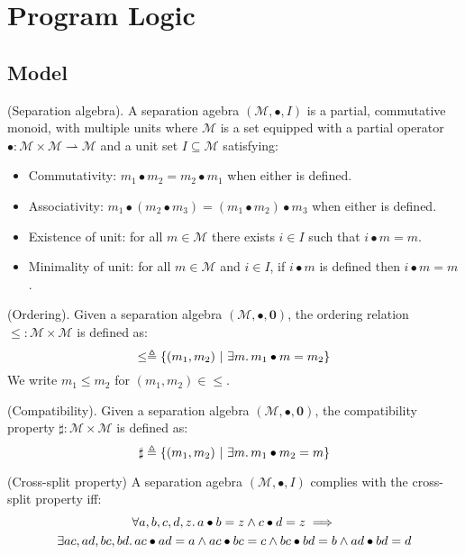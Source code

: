 \section{Program Logic}

\subsection{Model}

 (Separation algebra). A separation agebra $(\mathcal{M}, \bullet, I)$ is a partial, commutative monoid, with multiple units where $\mathcal{M}$ is a set equipped with a partial operator $\bullet : \mathcal{M} \times \mathcal{M} \rightharpoonup \mathcal{M}$ and a unit set $I \subseteq \mathcal{M}$ satisfying:
\begin{itemize}
\item Commutativity: $m_1 \bullet m_2 = m_2 \bullet m_1$ when either is defined.
\item Associativity: $m_1 \bullet (m_2 \bullet m_3) = (m_1 \bullet m_2) \bullet m_3$ when either is defined.
\item Existence of unit: for all $m \in \mathcal{M}$ there exists $i \in I$ such that $i \bullet m = m$.
\item Minimality of unit: for all $m \in \mathcal{M}$ and $i \in I$, if $i \bullet m$ is defined then $i \bullet m = m$.
\end{itemize}

 (Ordering). Given a separation algebra $(\mathcal{M}, \bullet, \mathbf{0})$, the ordering relation $\leq : \mathcal{M} \times \mathcal{M}$ is defined as:
\[
	\leq \triangleq \{ (m_1, m_2)\ |\ \exists m \ldotp m_1 \bullet m = m_2 \}
\]
We write $m_1 \leq m_2$ for $(m_1, m_2) \in \leq$.

 (Compatibility). Given a separation algebra $(\mathcal{M}, \bullet, \mathbf{0})$, the compatibility property $\sharp : \mathcal{M} \times \mathcal{M}$ is defined as:
\[
	\sharp \triangleq \{ (m_1, m_2)\ |\ \exists m \ldotp m_1 \bullet m_2 = m \}
\]

 (Cross-split property) A separation agebra $(\mathcal{M}, \bullet, I)$ complies with the cross-split property iff:
\begin{gather*}
	\forall a, b, c, d, z \ldotp a \bullet b = z \land c \bullet d = z \implies \\ \exists ac, ad, bc, bd \ldotp ac \bullet ad = a \land ac \bullet bc = c \land bc \bullet bd = b \land ad \bullet bd = d
\end{gather*}

